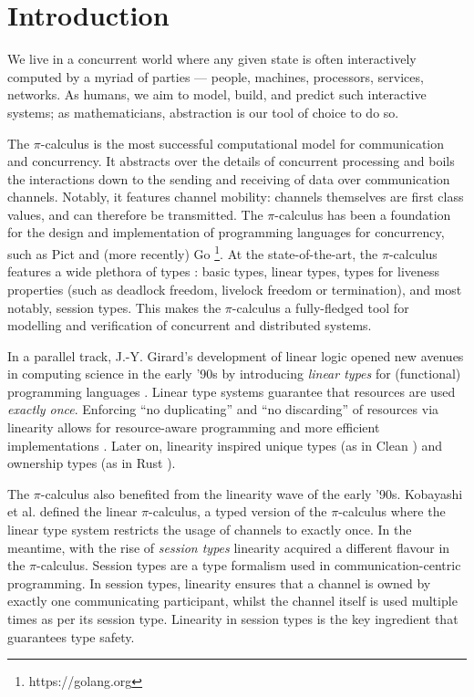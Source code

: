\documentclass[sigplan,10pt,anonymous,review]{acmart}
\theoremstyle{definition}
\newcommand{\picalc}{$\pi$-calculus}
\begin{document}
\section{Introduction}

We live in a concurrent world where any given state is often interactively computed by a myriad of parties --- people, machines, processors, services, networks.
As humans, we aim to model, build, and predict such interactive systems; as mathematicians, abstraction is our tool of choice to do so.

The \picalc{} \cite{MilnerPW92,Milner99} is the most successful computational model for communication and concurrency.
It abstracts over the details of concurrent processing and boils the interactions down to the sending and receiving of data over communication channels.
Notably, it features channel mobility: channels themselves are first class values, and can therefore be transmitted.
The \picalc{} has been a foundation for the design and implementation of programming languages for concurrency, such as Pict \cite{PierceT00} and (more recently) Go \footnote{https://golang.org}.
At the state-of-the-art, the \picalc{} features a wide plethora of types \cite{K07}: basic types, linear types, types for liveness properties (such as deadlock freedom, livelock freedom or termination), and most notably, session types. This makes the \picalc{} a fully-fledged tool for modelling and verification of concurrent and distributed systems.

In a parallel track, J.-Y. Girard's development of linear logic \cite{Girard87} opened new avenues in computing science in the early '90s by introducing \emph{linear types} for (functional) programming languages \cite{Wadler90,Bernardy2018}.
Linear type systems guarantee that resources are used \emph{exactly once}.
Enforcing ``no duplicating'' and ``no discarding'' of resources via linearity allows for resource-aware programming and more efficient implementations \cite{Wadler90}.
Later on, linearity inspired unique types (as in Clean \cite{BarendsenS96}) and ownership types (as in Rust \cite{MatsakisK14}).

The \picalc{} also benefited from the linearity wave of the early '90s.
Kobayashi et al. \cite{KPT96} defined the {linear} \picalc{}, a typed version of the \picalc{} where the linear type system restricts the usage of channels to exactly once.
%
In the meantime, with the rise of \emph{session types} \cite{H93,THK94,HVK98} linearity acquired a different flavour in the \picalc{}.
Session types are a type formalism used in communication-centric programming.
In session types, linearity ensures that a channel is owned by exactly one communicating participant, whilst the channel itself is used multiple times as per its session type.
Linearity in session types is the key ingredient that guarantees type safety.
\end{document}
